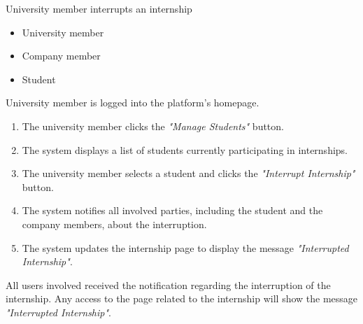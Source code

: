 \usecase
{University member interrupts an internship} 
{
    \begin{itemize}
        \item University member
        \item Company member
        \item Student
    \end{itemize}
}
{
    University member is logged into the platform's homepage.
}
{
    \begin{enumerate}
        \item The university member clicks the \textit{"Manage Students"} button.
        \item The system displays a list of students currently participating in internships.
        \item The university member selects a student and clicks the \textit{"Interrupt Internship"} button.
        \item The system notifies all involved parties, including the student and the company members, about the interruption.
        \item The system updates the internship page to display the message \textit{"Interrupted Internship"}.
    \end{enumerate}

}
{
    All users involved received the notification regarding the interruption of the internship. 
    Any access to the page related to the internship will show the message \textit{"Interrupted Internship"}. 
}{}{}



